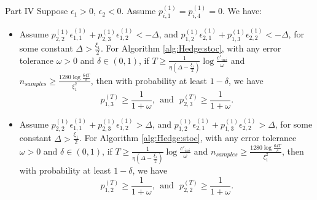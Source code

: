 \begin{fixedtheorem}{Part IV}
Suppose $\epsilon_1>0$, $\epsilon_2<0$. Assume $p^{(1)}_{i,1}=p^{(1)}_{i,4}=0$. We have:
\begin{itemize}
    \item Assume $p^{(1)}_{2,2}\epsilon^{(1)}_{1,1}+p^{(1)}_{2,3}\epsilon^{(1)}_{1,2}<-\Delta$, and $p^{(1)}_{1,2}\epsilon^{(1)}_{2,1}+p^{(1)}_{1,3}\epsilon^{(1)}_{2,2}<-\Delta$, for some constant $\Delta>\frac{\xi_1}{2}$. For Algorithm \ref{alg:Hedge:stoc}, with any error tolerance $\omega>0$ and $\delta\in(0,1)$, if $T\geq \frac{1}{\eta\left(\Delta-\frac{\xi_1}{2}\right)}\log\frac{c'_{ini}}{\omega}$ and $n_{samples}\geq \frac{1280\log\frac{64T}{\delta}}{\xi_1^2}$, then with probability at least $1-\delta$, we have  
    $$p^{(T)}_{1,3}\geq \frac{1}{1+\omega},\ \ \text{and}\ \ \  p^{(T)}_{2,3}\geq \frac{1}{1+\omega}.$$
    \item  Assume  
$p^{(1)}_{2,2}\epsilon^{(1)}_{1,1}+p^{(1)}_{2,3}\epsilon^{(1)}_{1,2}>\Delta$, and $p^{(1)}_{1,2}\epsilon^{(1)}_{2,1}+p^{(1)}_{1,3}\epsilon^{(1)}_{2,2}>\Delta$, for some constant $\Delta>\frac{\xi_1}{2}$. For Algorithm \ref{alg:Hedge:stoc}, with any error tolerance $\omega>0$ and $\delta\in(0,1)$, if $T\geq \frac{1}{\eta\left(\Delta-\frac{\xi_1}{2}\right)}\log\frac{c'_{ini}}{\omega}$ and $n_{samples}\geq \frac{1280\log\frac{64T}{\delta}}{\xi_1^2}$, then with probability at least $1-\delta$, we have 
$$p^{(T)}_{1,2}\geq \frac{1}{1+\omega},\ \ \text{and}\ \ \  p^{(T)}_{2,2}\geq \frac{1}{1+\omega}.$$
\end{itemize}
\end{fixedtheorem}




